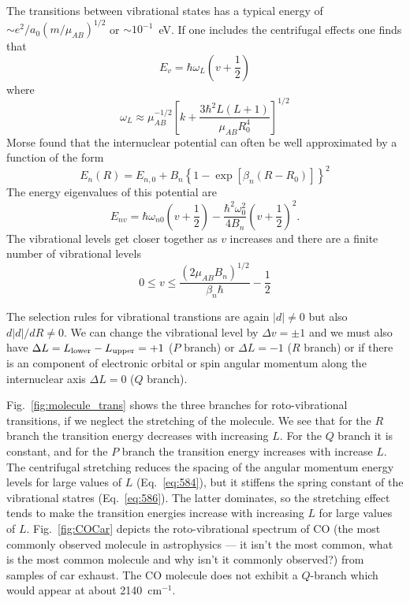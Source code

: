 The transitions between vibrational states has a typical energy of 
$\sim e^2/a_0 (m/\mu_{AB})^{1/2}$ or $\sim 10^{-1}$~eV.  If one
includes the centrifugal effects one finds that 
\begin{equation}
E_v = \hbar \omega_L \left ( v + \frac{1}{2} \right )
\label{eq:585}
\end{equation}
where
\begin{equation}
\omega_L \approx \mu_{AB}^{-1/2} \left [ k + \frac{3 \hbar^2
    L(L+1)}{\mu_{AB} R_0^4} \right ]^{1/2}
\label{eq:586}
\end{equation}
Morse found that the internuclear potential can often be well
approximated by a function of the form
\begin{equation}
E_n(R) = E_{n,0} + B_n \left \{ 1 - \exp \left[ \beta_n \left ( R -
  R_0 \right )\right ] \right \}^2
\label{eq:587}
\end{equation}
The energy eigenvalues of this potential are
\begin{equation}
E_{nv} = \hbar \omega_{n0} \left ( v + \frac{1}{2} \right ) -
\frac{\hbar^2 \omega_0^2}{4 B_n} \left ( v + \frac{1}{2} \right )^2.
\label{eq:588}
\end{equation}
The vibrational levels get closer together as $v$ increases and there
are a finite number of vibrational levels
\begin{equation}
0 \leq v \leq \frac{(2\mu_{AB} B_n)^{1/2}}{\beta_n \hbar} - \frac{1}{2}
\label{eq:589}
\end{equation}

The selection rules for vibrational transtions are again $|d|\neq 0$ but
also $d|d|/dR \neq 0$.  We can change the vibrational level by $\Delta
v=\pm 1$ and we must also have $\Delta L=L_\textrm{\scriptsize lower}-L_\textrm{\scriptsize upper}=+1$ ($P$ branch) or $\Delta
L=-1$ ($R$ branch) or if there is an component of electronic orbital
or spin angular momentum along the internuclear axis $\Delta L=0$ ($Q$ branch).

Fig.~\ref{fig:molecule_trans} shows the three branches for
roto-vibrational transitions, if we neglect the stretching of the
molecule.    We see that
for the $R$ branch the transition energy decreases with increasing $L$.
For the $Q$ branch it is constant, and for the $P$ branch the
transition energy increases with increase $L$.  The centrifugal stretching reduces the spacing of the
angular momentum energy levels for large values of $L$ (Eq.~\ref{eq:584}), but it
stiffens the spring constant of the vibrational statres (Eq.~\ref{eq:586}).  The latter
dominates, so the stretching effect
tends to make the transition energies increase with increasing $L$ for
large values of $L$.  Fig.~\ref{fig:COCar} depicts the
roto-vibrational spectrum of CO (the most commonly observed molecule
in astrophysics --- it isn't the most common, what is the most common
molecule and why isn't it commonly observed?) from samples of car
exhaust.  The CO molecule does not exhibit a $Q$-branch which would
appear at about 2140~cm$^{-1}$.

